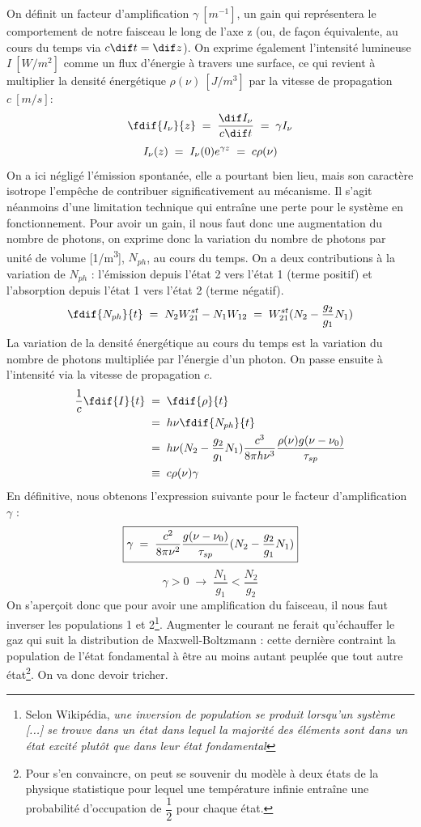 On définit un facteur d'amplification $\gamma\ [\si{m^{-1}}]$, un gain qui représentera le comportement de notre faisceau le long de l'axe z (ou, de façon équivalente, au cours du temps via $c\dif t = \dif z$). On exprime également l'intensité lumineuse $I\ [\si{W/m^2}]$ comme un flux d'énergie à travers une surface, ce qui revient à multiplier la densité énergétique $\rho(\nu)\ [\si{J/m^3}]$ par la vitesse de propagation $c\ [\si{m/s}]$:
\[
    \fdif{I_\nu}{z} \eq \dfrac{\dif I_\nu}{c\dif t} \eq \gamma I_\nu
\]
\[
    I_\nu(z) \; = \; I_\nu(0) e^{\gamma z} \; = \; c\rho(\nu)
\]
On a ici négligé l'émission spontanée, elle a pourtant bien lieu, mais son caractère isotrope l'empêche de contribuer significativement au mécanisme. Il s'agit néanmoins d'une limitation technique qui entraîne une perte pour le système en fonctionnement.
Pour avoir un gain, il nous faut donc une augmentation du nombre de photons, on exprime donc la variation du nombre de photons par unité de volume [\si{1/m^3}], $N_{ph}$, au cours du temps. On a deux contributions à la variation de $N_{ph}$ : l'émission depuis l'état 2 vers l'état 1 (terme positif) et l'absorption depuis l'état 1 vers l'état 2 (terme négatif).
\[
    \fdif{N_{ph}}{t}
    \eq N_2 W_{21}^{st} - N_1 W_{12}
    \eq W_{21}^{st} (N_2 - \dfrac{g_2}{g_1}N_1)
\]
La variation de la densité énergétique au cours du temps est la variation du nombre de photons multipliée par l'énergie d'un photon. On passe ensuite à l'intensité via la vitesse de propagation $c$.
\begin{align*}
    \dfrac{1}{c}\fdif{I}{t}
    &\eq  \fdif{\rho}{t}\\
    &\eq  h\nu\fdif{N_{ph}}{t}\\
    &\eq  h\nu (N_2 - \dfrac{g_2}{g_1}N_1) \dfrac{c^3}{8\pi h \nu^3}\dfrac{\rho(\nu) g(\nu - \nu_0)}{\tau_{sp}}\\
    &\;\equiv\;  c\rho(\nu)\gamma
\end{align*}
En définitive, nous obtenons l'expression suivante pour le facteur d'amplification $\gamma$ :
\begin{equation}
    \boxed{
        \gamma \; = \; \dfrac{c^2}{8\pi\nu^2}\dfrac{g(\nu - \nu_0)}{\tau_{sp}}(N_2 - \dfrac{g_2}{g_1}N_1)
    }
\end{equation}
\[
\boxed{
    \gamma > 0 \; \longrightarrow \; \dfrac{N_1}{g_1} < \dfrac{N_2}{g_2}
    }
\]
On s'aperçoit donc que pour avoir une amplification du faisceau, il nous faut inverser les populations 1 et 2\footnote{Selon Wikipédia, \textit{une inversion de population se produit lorsqu'un système [...] se trouve dans un état dans lequel la majorité des éléments sont dans un état excité plutôt que dans leur état fondamental}}. Augmenter le courant ne ferait qu'échauffer le gaz qui suit la distribution de Maxwell-Boltzmann : cette dernière contraint la population de l'état fondamental à être au moins autant peuplée que tout autre état\footnote{Pour s'en convaincre, on peut se souvenir du modèle à deux états de la physique statistique pour lequel une température infinie entraîne une probabilité d'occupation de $\dfrac{1}{2}$ pour chaque état.}. On va donc devoir tricher.


